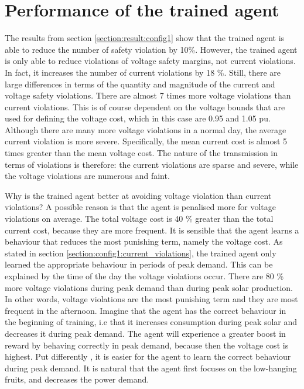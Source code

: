 \documentclass[class=book, crop=false, 11pt]{standalone}
\begin{document}
\section{Performance of the trained agent}
The results from section \ref{section:result:config1} show that the trained agent is able to reduce the number of safety violation by 10\%. However, the trained agent is only able to reduce violations of voltage safety margins, not current violations. In fact, it increases the number of current violations by 18 \%. Still, there are large differences in terms of the quantity and magnitude of the current and voltage safety violations. There are almost 7 times more voltage violations than current violations. This is of course dependent on the voltage bounds that are used for defining the voltage cost, which in this case are 0.95 and 1.05 pu. Although there are many more voltage violations in a normal day, the average current violation is more severe. Specifically, the mean current cost is almost 5 times greater than the mean voltage cost. The nature of the transmission in terms of violations is therefore: the current violations are sparse and severe, while the voltage violations are numerous and faint. 

Why is the trained agent better at avoiding voltage violation than current violations? A possible reason is that the agent is penalised more for voltage violations on average. The total voltage cost is 40 \% greater than the total current cost, because they are more frequent. It is sensible that the agent learns a behaviour that reduces the most punishing term, namely the voltage cost. As stated in section \ref{section:config1:current_violations}, the trained agent only learned the appropriate behaviour in periods of peak demand. This can be explained by the time of the day the voltage violations occur. There are 80 \% more voltage violations during peak demand than during peak solar production. In other words, voltage violations are the most punishing term and they are most frequent in the afternoon. Imagine that the agent has the correct behaviour in the beginning of training, i.e that it increases consumption during peak solar and decreases it during peak demand. The agent will experience a greater boost in reward by behaving correctly in peak demand, because then the voltage cost is highest. Put differently , it is easier for the agent to learn the correct behaviour during peak demand. It is natural that the agent first focuses on the low-hanging fruits, and decreases the power demand. 
\end{document}
